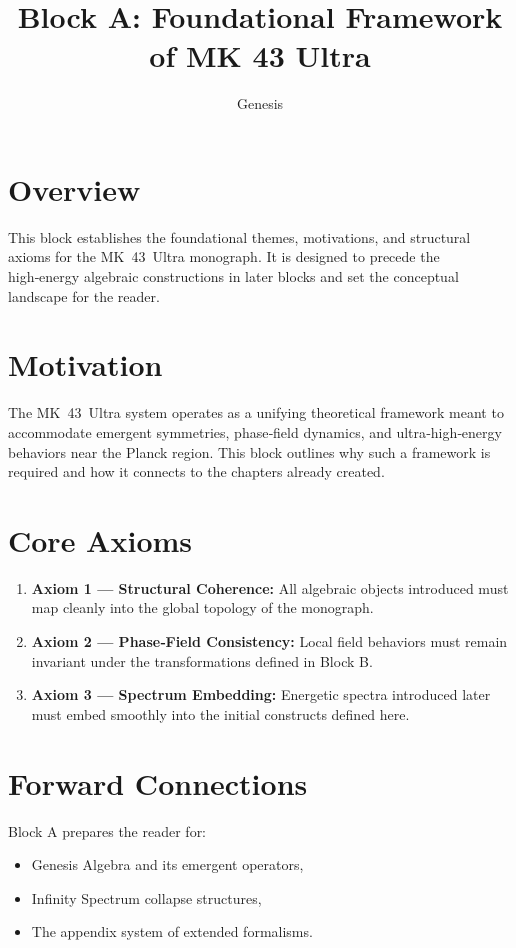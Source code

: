 \documentclass[11pt]{article}
\begin{document}
\title{Block A: Foundational Framework of MK 43 Ultra}
\author{Genesis}
\date{}

\maketitle

\section{Overview}
This block establishes the foundational themes, motivations, and structural axioms for the MK~43~Ultra monograph. It is designed to precede the high‑energy algebraic constructions in later blocks and set the conceptual landscape for the reader.

\section{Motivation}
The MK~43~Ultra system operates as a unifying theoretical framework meant to accommodate emergent symmetries, phase‑field dynamics, and ultra‑high‑energy behaviors near the Planck region. This block outlines why such a framework is required and how it connects to the chapters already created.

\section{Core Axioms}
\begin{enumerate}
    \item \textbf{Axiom 1 — Structural Coherence:} All algebraic objects introduced must map cleanly into the global topology of the monograph.
    \item \textbf{Axiom 2 — Phase‑Field Consistency:} Local field behaviors must remain invariant under the transformations defined in Block B.
    \item \textbf{Axiom 3 — Spectrum Embedding:} Energetic spectra introduced later must embed smoothly into the initial constructs defined here.
\end{enumerate}

\section{Forward Connections}
Block A prepares the reader for:
\begin{itemize}
    \item Genesis Algebra and its emergent operators,
    \item Infinity Spectrum collapse structures,
    \item The appendix system of extended formalisms.
\end{itemize}
\end{document}
